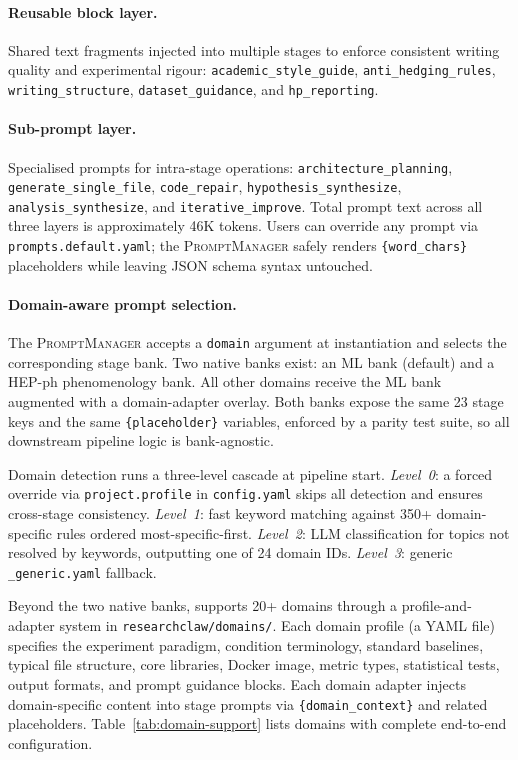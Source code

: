 \paragraph{Reusable block layer.}
Shared text fragments injected into multiple stages to enforce consistent writing quality and experimental rigour: \texttt{academic\_style\_guide}, \texttt{anti\_hedging\_rules}, \texttt{writing\_structure}, \texttt{dataset\_guidance}, and \texttt{hp\_reporting}.

\paragraph{Sub-prompt layer.}
Specialised prompts for intra-stage operations: \texttt{architecture\_planning}, \texttt{generate\_single\_file}, \texttt{code\_repair}, \texttt{hypothesis\_synthesize}, \texttt{analysis\_synthesize}, and \texttt{iterative\_improve}.
Total prompt text across all three layers is approximately 46K tokens.
Users can override any prompt via \texttt{prompts.default.yaml}; the \textsc{PromptManager} safely renders \texttt{\{word\_chars\}} placeholders while leaving JSON schema syntax untouched.

\paragraph{Domain-aware prompt selection.}
The \textsc{PromptManager} accepts a \texttt{domain} argument at instantiation and selects the corresponding stage bank.
Two native banks exist: an ML bank (default) and a HEP-ph phenomenology bank.
All other domains receive the ML bank augmented with a domain-adapter overlay.
Both banks expose the same 23 stage keys and the same \texttt{\{placeholder\}} variables, enforced by a parity test suite, so all downstream pipeline logic is bank-agnostic.

Domain detection runs a three-level cascade at pipeline start.
\emph{Level~0}: a forced override via \texttt{project.profile} in \texttt{config.yaml} skips all detection and ensures cross-stage consistency.
\emph{Level~1}: fast keyword matching against 350+ domain-specific rules ordered most-specific-first.
\emph{Level~2}: LLM classification for topics not resolved by keywords, outputting one of 24 domain IDs.
\emph{Level~3}: generic \texttt{\_generic.yaml} fallback.

Beyond the two native banks, \system{} supports 20+ domains through a profile-and-adapter system in \texttt{researchclaw/domains/}.
Each domain profile (a YAML file) specifies the experiment paradigm, condition terminology, standard baselines, typical file structure, core libraries, Docker image, metric types, statistical tests, output formats, and prompt guidance blocks.
Each domain adapter injects domain-specific content into stage prompts via \texttt{\{domain\_context\}} and related placeholders.
Table~\ref{tab:domain-support} lists domains with complete end-to-end configuration.

